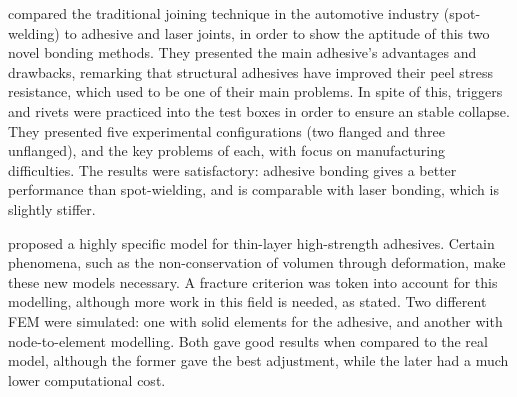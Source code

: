 \citet{Peroni2009} compared the traditional joining technique in the automotive industry (spot-welding) to adhesive and laser joints, in order to show the aptitude of this two novel bonding methods. They presented the main adhesive's advantages and drawbacks, remarking that structural adhesives have improved their peel stress resistance, which used to be one of their main problems. In spite of this, triggers and rivets were practiced into the test boxes in order to ensure an stable collapse. They presented five experimental configurations (two flanged and three unflanged), and the key problems of each, with focus on manufacturing difficulties. The results were satisfactory: adhesive bonding gives a better performance than spot-wielding, and is comparable with laser bonding, which is slightly stiffer.

\citet{Greve2007} proposed a highly specific model for thin-layer high-strength adhesives. Certain phenomena, such as the non-conservation of volumen through deformation, make these new models necessary. A fracture criterion was token into account for this modelling, although more work in this field is needed, as stated. Two different FEM were simulated: one with solid elements for the adhesive, and another with node-to-element modelling. Both gave good results when compared to the real model, although the former gave the best adjustment, while the later had a much lower computational cost.
